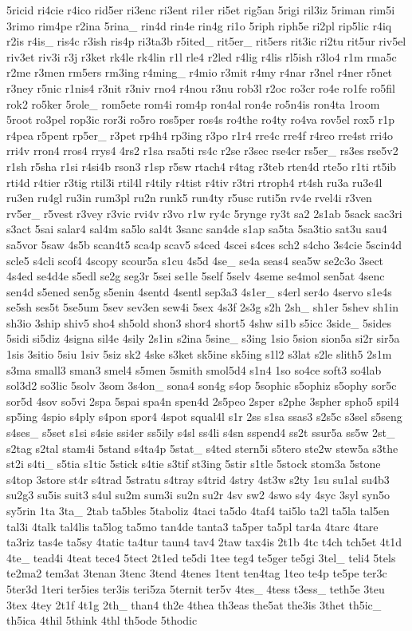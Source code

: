 \begin{DoxyCompactItemize}
5ricid ri4cie r4ico rid5er ri3enc ri3ent ri1er ri5et rig5an 5rigi ril3iz 5riman rim5i 3rimo rim4pe r2ina 5rina\-\_\- rin4d rin4e rin4g ri1o 5riph riph5e ri2pl rip5lic r4iq r2is r4is\-\_\- ris4c r3ish ris4p ri3ta3b r5ited\-\_\- rit5er\-\_\- rit5ers rit3ic ri2tu rit5ur riv5el riv3et riv3i r3j r3ket rk4le rk4lin r1l rle4 r2led r4lig r4lis rl5ish r3lo4 r1m rma5c r2me r3men rm5ers rm3ing r4ming\-\_\- r4mio r3mit r4my r4nar r3nel r4ner r5net r3ney r5nic r1nis4 r3nit r3niv rno4 r4nou r3nu rob3l r2oc ro3cr ro4e ro1fe ro5fil rok2 ro5ker 5role\-\_\- rom5ete rom4i rom4p ron4al ron4e ro5n4is ron4ta 1room 5root ro3pel rop3ic ror3i ro5ro ros5per ros4s ro4the ro4ty ro4va rov5el rox5 r1p r4pea r5pent rp5er\-\_\- r3pet rp4h4 rp3ing r3po r1r4 rre4c rre4f r4reo rre4st rri4o rri4v rron4 rros4 rrys4 4rs2 r1sa rsa5ti rs4c r2se r3sec rse4cr rs5er\-\_\- rs3es rse5v2 r1sh r5sha r1si r4si4b rson3 r1sp r5sw rtach4 r4tag r3teb rten4d rte5o r1ti rt5ib rti4d r4tier r3tig rtil3i rtil4l r4tily r4tist r4tiv r3tri rtroph4 rt4sh ru3a ru3e4l ru3en ru4gl ru3in rum3pl ru2n runk5 run4ty r5usc ruti5n rv4e rvel4i r3ven rv5er\-\_\- r5vest r3vey r3vic rvi4v r3vo r1w ry4c 5rynge ry3t sa2 2s1ab 5sack sac3ri s3act 5sai salar4 sal4m sa5lo sal4t 3sanc san4de s1ap sa5ta 5sa3tio sat3u sau4 sa5vor 5saw 4s5b scan4t5 sca4p scav5 s4ced 4scei s4ces sch2 s4cho 3s4cie 5scin4d scle5 s4cli scof4 4scopy scour5a s1cu 4s5d 4se\-\_\- se4a seas4 sea5w se2c3o 3sect 4s4ed se4d4e s5edl se2g seg3r 5sei se1le 5self 5selv 4seme se4mol sen5at 4senc sen4d s5ened sen5g s5enin 4sentd 4sentl sep3a3 4s1er\-\_\- s4erl ser4o 4servo s1e4s se5sh ses5t 5se5um 5sev sev3en sew4i 5sex 4s3f 2s3g s2h 2sh\-\_\- sh1er 5shev sh1in sh3io 3ship shiv5 sho4 sh5old shon3 shor4 short5 4shw si1b s5icc 3side\-\_\- 5sides 5sidi si5diz 4signa sil4e 4sily 2s1in s2ina 5sine\-\_\- s3ing 1sio 5sion sion5a si2r sir5a 1sis 3sitio 5siu 1siv 5siz sk2 4ske s3ket sk5ine sk5ing s1l2 s3lat s2le slith5 2s1m s3ma small3 sman3 smel4 s5men 5smith smol5d4 s1n4 1so so4ce soft3 so4lab sol3d2 so3lic 5solv 3som 3s4on\-\_\- sona4 son4g s4op 5sophic s5ophiz s5ophy sor5c sor5d 4sov so5vi 2spa 5spai spa4n spen4d 2s5peo 2sper s2phe 3spher spho5 spil4 sp5ing 4spio s4ply s4pon spor4 4spot squal4l s1r 2ss s1sa ssas3 s2s5c s3sel s5seng s4ses\-\_\- s5set s1si s4sie ssi4er ss5ily s4sl ss4li s4sn sspend4 ss2t ssur5a ss5w 2st\-\_\- s2tag s2tal stam4i 5stand s4ta4p 5stat\-\_\- s4ted stern5i s5tero ste2w stew5a s3the st2i s4ti\-\_\- s5tia s1tic 5stick s4tie s3tif st3ing 5stir s1tle 5stock stom3a 5stone s4top 3store st4r s4trad 5stratu s4tray s4trid 4stry 4st3w s2ty 1su su1al su4b3 su2g3 su5is suit3 s4ul su2m sum3i su2n su2r 4sv sw2 4swo s4y 4syc 3syl syn5o sy5rin 1ta 3ta\-\_\- 2tab ta5bles 5taboliz 4taci ta5do 4taf4 tai5lo ta2l ta5la tal5en tal3i 4talk tal4lis ta5log ta5mo tan4de tanta3 ta5per ta5pl tar4a 4tarc 4tare ta3riz tas4e ta5sy 4tatic ta4tur taun4 tav4 2taw tax4is 2t1b 4tc t4ch tch5et 4t1d 4te\-\_\- tead4i 4teat tece4 5tect 2t1ed te5di 1tee teg4 te5ger te5gi 3tel\-\_\- teli4 5tels te2ma2 tem3at 3tenan 3tenc 3tend 4tenes 1tent ten4tag 1teo te4p te5pe ter3c 5ter3d 1teri ter5ies ter3is teri5za 5ternit ter5v 4tes\-\_\- 4tess t3ess\-\_\- teth5e 3teu 3tex 4tey 2t1f 4t1g 2th\-\_\- than4 th2e 4thea th3eas the5at the3is 3thet th5ic\-\_\- th5ica 4thil 5think 4thl th5ode 5thodic 
\end{DoxyCompactItemize}
